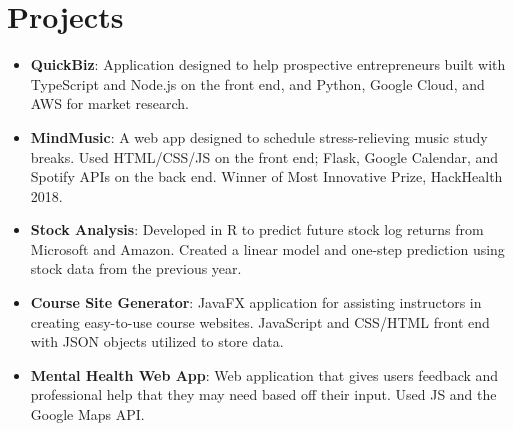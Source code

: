 \documentclass[letterpaper,12pt]{article}
\newcommand{\resumeItem}[2]{
  \item\small{
    \textbf{#1}{: #2 \vspace{-2pt}}
  }
}
\newcommand{\resumeSubItem}[2]{\resumeItem{#1}{#2}\vspace{-4pt}}
\newcommand{\resumeSubHeadingListStart}{\begin{itemize}[leftmargin=*]}
\newcommand{\resumeSubHeadingListEnd}{\end{itemize}}
\begin{document}
\section{Projects}
  \resumeSubHeadingListStart
    \resumeSubItem{QuickBiz}
    {Application designed to help prospective entrepreneurs built with TypeScript and Node.js on the front end, and Python, Google Cloud, and AWS for market research.}
    \resumeSubItem{MindMusic}
      {A web app designed to schedule stress-relieving music study breaks.  Used HTML/CSS/JS on the front end; Flask, Google Calendar, and Spotify APIs on the back end.  Winner of Most Innovative Prize, HackHealth 2018.}
    \resumeSubItem{Stock Analysis}
      {Developed in R to predict future stock log returns from Microsoft and Amazon.  Created a linear model and one-step prediction using stock data from the previous year.}
    \resumeSubItem{Course Site Generator}
      {JavaFX application for assisting instructors in creating easy-to-use course websites.  JavaScript and CSS/HTML front end with JSON objects utilized to store data.}
    \resumeSubItem{Mental Health Web App}
      {Web application that gives users feedback and professional help that they may need based off their input.  Used JS and the Google Maps API.}
  \resumeSubHeadingListEnd
  
\end{document}
